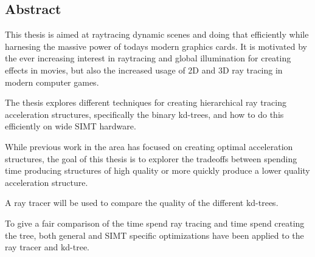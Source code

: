 

\begin{center}
\begin{minipage}{0.7\textwidth}
\section*{Abstract}
This thesis is aimed at raytracing dynamic scenes and doing that
efficiently while harnesing the massive power of todays modern
graphics cards. It is motivated by the ever increasing interest in
raytracing and global illumination for creating effects in movies, but
also the increased usage of 2D and 3D ray tracing in modern computer
games.

The thesis explores different techniques for creating hierarchical ray
tracing acceleration structures, specifically the binary kd-trees, and
how to do this efficiently on wide SIMT hardware.

While previous work in the area has focused on creating optimal
acceleration structures, the goal of this thesis is to explorer the
tradeoffs between spending time producing structures of high quality
or more quickly produce a lower quality acceleration structure.

A ray tracer will be used to compare the quality of the different
kd-trees.


To give a fair comparison of the time spend ray tracing and time spend
creating the tree, both general and SIMT specific optimizations have
been applied to the ray tracer and kd-tree.

\end{minipage}
\end{center}










